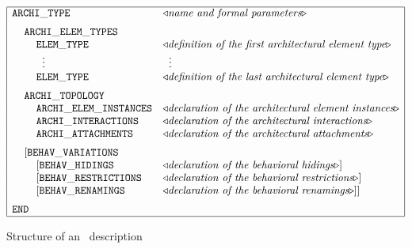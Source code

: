 	\begin{table}[thb]

\[\begin{array}{|ll|}
\hline
{\tt ARCHI\_TYPE} & \triangleleft \textit{name and formal parameters} \triangleright \\[0.2cm]
\hspace*{0.4cm} {\tt ARCHI\_ELEM\_TYPES} & \\
\hspace*{0.8cm} {\tt ELEM\_TYPE} & \triangleleft \textit{definition of the first architectural element type}
\triangleright \\
\hspace*{1.0cm} \vdots & \hspace{0.2cm} \vdots \\
\hspace*{0.8cm} {\tt ELEM\_TYPE} & \triangleleft \textit{definition of the last architectural element type}
\triangleright \\[0.2cm]
\hspace*{0.4cm} {\tt ARCHI\_TOPOLOGY} & \\
\hspace*{0.8cm} {\tt ARCHI\_ELEM\_INSTANCES} & \triangleleft \textit{declaration of the architectural
element instances} \triangleright \\
\hspace*{0.8cm} {\tt ARCHI\_INTERACTIONS} & \triangleleft \textit{declaration of the architectural
interactions} \triangleright \\
\hspace*{0.8cm} {\tt ARCHI\_ATTACHMENTS} & \triangleleft \textit{declaration of the architectural
attachments} \triangleright \\[0.2cm]
\hspace*{0.4cm} [{\tt BEHAV\_VARIATIONS} & \\
\hspace*{0.8cm} [{\tt BEHAV\_HIDINGS} & \triangleleft \textit{declaration of the behavioral hidings}
\triangleright] \\
\hspace*{0.8cm} [{\tt BEHAV\_RESTRICTIONS} & \triangleleft \textit{declaration of the behavioral
restrictions} \triangleright] \\
\hspace*{0.8cm} [{\tt BEHAV\_RENAMINGS} & \triangleleft \textit{declaration of the behavioral renamings}
\triangleright]] \\[0.2cm]
{\tt END} & \\
\hline
\end{array}\]

\caption{Structure of an \aemilia\ description}\label{text}

	\end{table}

